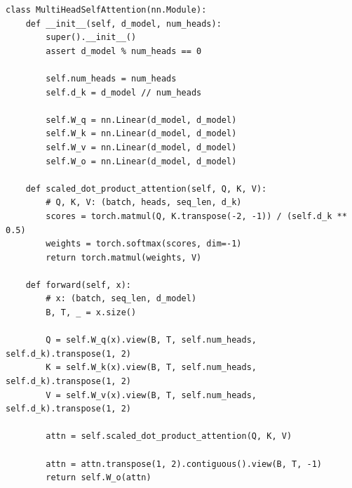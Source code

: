 \begin{listing}
    \begin{verbatim}
class MultiHeadSelfAttention(nn.Module):
    def __init__(self, d_model, num_heads):
        super().__init__()
        assert d_model % num_heads == 0

        self.num_heads = num_heads
        self.d_k = d_model // num_heads

        self.W_q = nn.Linear(d_model, d_model)
        self.W_k = nn.Linear(d_model, d_model)
        self.W_v = nn.Linear(d_model, d_model)
        self.W_o = nn.Linear(d_model, d_model)

    def scaled_dot_product_attention(self, Q, K, V):
        # Q, K, V: (batch, heads, seq_len, d_k)
        scores = torch.matmul(Q, K.transpose(-2, -1)) / (self.d_k ** 0.5)
        weights = torch.softmax(scores, dim=-1)
        return torch.matmul(weights, V)

    def forward(self, x):
        # x: (batch, seq_len, d_model)
        B, T, _ = x.size()

        Q = self.W_q(x).view(B, T, self.num_heads, self.d_k).transpose(1, 2)
        K = self.W_k(x).view(B, T, self.num_heads, self.d_k).transpose(1, 2)
        V = self.W_v(x).view(B, T, self.num_heads, self.d_k).transpose(1, 2)

        attn = self.scaled_dot_product_attention(Q, K, V)

        attn = attn.transpose(1, 2).contiguous().view(B, T, -1)
        return self.W_o(attn)
    \end{verbatim}
    \caption{Minimal Implementation of Multi-Head Self-Attention}
    \label{lst:multihead_self_attention}
\end{listing}
